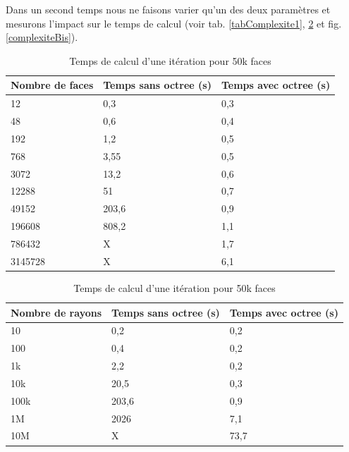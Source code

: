 Dans un second temps nous ne faisons varier qu'un des deux paramètres et mesurons l'impact sur le temps de calcul (voir tab. \ref{tabComplexite1},  \ref{tabComplexite2} et fig. \ref{complexiteBis}).

\begin{table}
\footnotesize
\center
\begin{minipage}[t]{0.45\textwidth}
	\begin{tabular}{|  m{2cm} |  m{2cm} |  m{2cm} |}
		\hline
		Nombre de faces & Temps \textbf{sans} \gls{octree} (s) & Temps \textbf{avec} \gls{octree} (s)\\
		  \hline
		  \hline
		   12 &0,3&	0,3 \\
		   \hline
		48 &0,6	&0,4 \\
		   \hline
		192 & 1,2	&0,5\\
		   \hline
		768 & 3,55&	0,5\\
		   \hline
		3072 & 13,2	&0,6\\
		   \hline
		12288 &51	&0,7 \\
		     \hline
		     49152 & 203,6	&0,9\\
		   \hline
		196608 & 808,2	&1,1\\
		\hline
		786432 & X & 1,7 \\
		\hline
		3145728 & X & 6,1 \\
		\hline
	 \end{tabular}
	\caption{Temps de calcul d'une itération pour 100k rayons}
	\label{tabComplexite1}
\end{minipage}
\hfill
\begin{minipage}[t]{0.45\textwidth}
	\begin{tabular}{|  m{2cm} |  m{2cm} |  m{2cm} |}
		\hline
		Nombre de rayons & Temps \textbf{sans} \gls{octree} (s)& Temps \textbf{avec} \gls{octree} (s)\\
		  \hline
		  \hline
		   10 &0,2&	0,2 \\
		   \hline
		100 &0,4	&0,2 \\
		   \hline
		1k & 2,2	&0,2\\
		   \hline
		10k & 20,5&	0,3\\
		   \hline
		100k & 203,6&	0,9\\
		   \hline
		1M &2026 &	7,1 \\
		\hline
		10M & X &	73,7 \\
		\hline
	 \end{tabular}
	\caption{Temps de calcul d'une itération pour 50k faces}
	\label{tabComplexite2}
\end{minipage}
\end{table}



